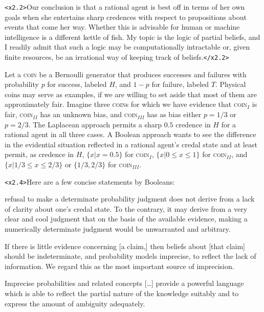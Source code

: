 \documentclass[11pt]{article}
\begin{document}
\texttt{<x2.2>}Our conclusion is that a rational agent is best off in
terms of her own goals when she entertains sharp credences with
respect to propositions about events that come her way. Whether this
is advisable for human or machine intelligence is a different kettle
of fish. My topic is the logic of partial beliefs, and I readily admit
that such a logic may be computationally intractable or, given finite
resources, be an irrational way of keeping track of
beliefs.\texttt{</x2.2>}

Let a \textsc{coin} be a Bernoulli generator that produces successes
and failures with probability $p$ for success, labeled $H$, and $1-p$
for failure, labeled $T$. Physical coins may serve as examples, if we
are willing to set aside that most of them are approximately fair.
Imagine three \textsc{coin}s for which we have evidence that
\textsc{coin}$_{I}$ is fair, \textsc{coin}$_{II}$ has an unknown bias,
and \textsc{coin}$_{III}$ has as bias either $p=1/3$ or $p=2/3$. The
Laplacean approach permits a sharp $0.5$ credence in $H$ for a
rational agent in all three cases. A Boolean approach wants to see the
difference in the evidential situation reflected in a rational agent's
credal state and at least permit, as credence in $H$, $\{x|x=0.5\}$
for \textsc{coin}$_{I}$, $\{x|0\leq{}x\leq{}1\}$ for
\textsc{coin}$_{II}$, and $\{x|1/3\leq{}x\leq{}2/3\}$ or $\{1/3,2/3\}$
for \textsc{coin}$_{III}$.

\texttt{<x2.4>}Here are a few concise statements by Booleans:

\begin{quotex}
  [A] refusal to make a determinate probability judgment does not
  derive from a lack of clarity about one's credal state. To the
  contrary, it may derive from a very clear and cool judgment that on
  the basis of the available evidence, making a numerically
  determinate judgment would be unwarranted and arbitrary.
\end{quotex}

\begin{quotex}
  If there is little evidence concerning [a claim,] then beliefs about
  [that claim] should be indeterminate, and probability models
  imprecise, to reflect the lack of information. We regard this as the
  most important source of imprecision. 
\end{quotex}

\begin{quotex}
  Imprecise probabilities and related concepts [{\ldots}] provide a
  powerful language which is able to reflect the partial nature of the
  knowledge suitably and to express the amount of ambiguity
  adequately. 
\end{quotex}
\end{document}
